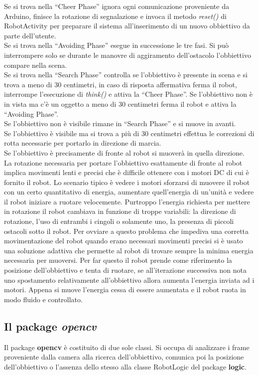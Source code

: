 Se si trova nella ``Cheer Phase'' ignora ogni comunicazione proveniente da 
Arduino, finisce la rotazione di segnalazione e invoca il metodo \emph{reset()} di 
RobotActivity per preparare il sistema all'inserimento di un nuovo obbiettivo da 
parte dell'utente.\\
Se si trova nella ``Avoiding Phase'' esegue in successione le tre fasi. 
Si può interrompere solo se durante le manovre di aggiramento dell'ostacolo
l'obbiettivo compare nella scena.\\
Se si trova nella ``Search Phase'' controlla se l'obbiettivo è presente in scena e 
si trova a meno di 30 centimetri, in caso di risposta affermativa ferma il robot,
interrompe l'esecuzione di \emph{think()} e attiva la ``Cheer Phase''. 
Se l'obbiettivo non è in vista ma c'è un oggetto a meno di 30 centimetri ferma il robot
e attiva la ``Avoiding Phase''.\\
Se l'obbiettivo non è visibile rimane in ``Search Phase'' e si muove in avanti.\\
Se l'obbiettivo è visibile ma si trova a più di 30 centimetri effettua le correzioni di rotta
necessarie per portarlo in direzione di marcia.\\
Se l'obbiettivo è precisamente di fronte al robot si muoverà in quella direzione.\\ 
La rotazione necessaria per portare l'obbiettivo esattamente di fronte al robot 
implica movimenti lenti e precisi che è difficile ottenere con i motori DC di cui è
fornito il robot. Lo scenario tipico è vedere i motori sforzarsi di muovere il robot
con un certo quantitativo di energia, aumentare quell'energia di un'unità e vedere 
il robot iniziare a ruotare velocemente. Purtroppo l'energia richiesta per 
mettere in rotazione il robot cambiava in funzione di troppe variabili: 
la direzione di rotazione, l'uso di entrambi i cingoli o solamente uno, 
la presenza di piccoli ostacoli sotto il robot. Per ovviare a questo problema che impediva 
una corretta movimentazione del robot quando erano necessari movimenti precisi 
si è usato una soluzione adattiva che permette al robot di trovare sempre la 
minima energia necessaria per muoversi. Per far questo il robot prende come riferimento 
la posizione dell'obbiettivo e tenta di ruotare, se all'iterazione successiva 
non nota uno spostamento relativamente all'obbiettivo allora aumenta 
l'energia inviata ad i motori. Appena si muove l'energia cessa di essere 
aumentata e il robot ruota in modo fluido e controllato.
\subsection {Il package \textit{opencv}}
Il package \textbf{opencv} è costituito di due sole classi. Si occupa di analizzare 
i frame proveniente dalla camera alla ricerca dell'obbiettivo, comunica poi la posizione 
dell'obbiettivo o l'assenza dello stesso alla classe RobotLogic del package 
\textbf{logic}.
